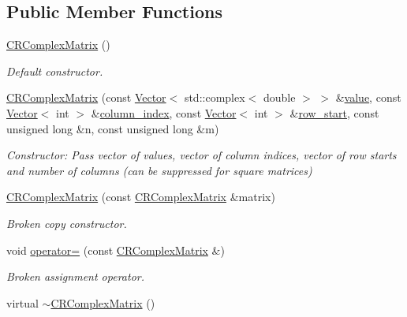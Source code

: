 \subsection*{Public Member Functions}
\begin{DoxyCompactItemize}
\item 
\hyperlink{classoomph_1_1CRComplexMatrix_aafc13fb96931fb4d62bad6c3146602af}{C\+R\+Complex\+Matrix} ()
\begin{DoxyCompactList}\small\item\em Default constructor. \end{DoxyCompactList}\item 
\hyperlink{classoomph_1_1CRComplexMatrix_a2d7141c949fd722ebe025959745e0e76}{C\+R\+Complex\+Matrix} (const \hyperlink{classoomph_1_1Vector}{Vector}$<$ std\+::complex$<$ double $>$ $>$ \&\hyperlink{classoomph_1_1SparseMatrix_a3e382ff145082821a6b0b3e63b6aed5d}{value}, const \hyperlink{classoomph_1_1Vector}{Vector}$<$ int $>$ \&\hyperlink{classoomph_1_1CRMatrix_aa6057d1c2a9a491f643e0633c778f8fb}{column\+\_\+index}, const \hyperlink{classoomph_1_1Vector}{Vector}$<$ int $>$ \&\hyperlink{classoomph_1_1CRMatrix_a6210ebb3d384de9c3a289f5d841a0d7a}{row\+\_\+start}, const unsigned long \&n, const unsigned long \&m)
\begin{DoxyCompactList}\small\item\em Constructor\+: Pass vector of values, vector of column indices, vector of row starts and number of columns (can be suppressed for square matrices) \end{DoxyCompactList}\item 
\hyperlink{classoomph_1_1CRComplexMatrix_aa7065ac556f955e2332c5954ddd2c9fc}{C\+R\+Complex\+Matrix} (const \hyperlink{classoomph_1_1CRComplexMatrix}{C\+R\+Complex\+Matrix} \&matrix)
\begin{DoxyCompactList}\small\item\em Broken copy constructor. \end{DoxyCompactList}\item 
void \hyperlink{classoomph_1_1CRComplexMatrix_a2c71c4bab418cf3fd362072f5c5587d2}{operator=} (const \hyperlink{classoomph_1_1CRComplexMatrix}{C\+R\+Complex\+Matrix} \&)
\begin{DoxyCompactList}\small\item\em Broken assignment operator. \end{DoxyCompactList}\item 
virtual \hyperlink{classoomph_1_1CRComplexMatrix_a355bb8b8f6ff1e504bb8e449d6fbfb0a}{$\sim$\+C\+R\+Complex\+Matrix} ()

\end{DoxyCompactItemize}
